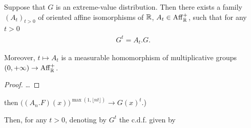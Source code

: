\begin{lemma}
  \label{lem:self-similarity-of-extreme-value-distributions}
  \leanok
  Suppose that $G$ is an extreme-value distribution.
  Then there exists a family $(A_t)_{t > 0}$ of
  oriented affine isomorphisms of $\mathbb{R}$, $A_t \in \mathrm{Aff}^+_{\mathbb{R}}$,
  such that for any $t > 0$
  \begin{align*}
    G^t = A_t . G .
  \end{align*}

  Moreover, $t \mapsto A_t$ is a measurable homomorphism
  of multiplicative groups $(0,+\infty) \to \mathrm{Aff}^+_{\mathbb{R}}$.
\end{lemma}
\begin{proof}
  \ldots
\end{proof}

%
%
%
%
  then $\big((A_n.F)(x)\big)^{\max(1, \lfloor n t \rfloor)} \to G(x)^t$.)

  Then, for any $t > 0$, denoting by $G^t$ the c.d.f. given by


